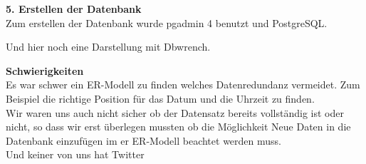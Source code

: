 \documentclass[a4paper ,8pt,x11names]{article}
\begin{document}
\newpage
\begin{flushleft}
\textbf{5. Erstellen der Datenbank}
\vspace{0.25cm}\\
Zum erstellen der Datenbank wurde pgadmin 4 benutzt und PostgreSQL.
\begin{center}
\end{center}
Und hier noch eine Darstellung mit Dbwrench.
\begin{center}
\end{center}
\end{flushleft}

\newpage
\begin{flushleft}
\textbf{Schwierigkeiten}
\vspace{0.25cm}\\
Es war schwer ein ER-Modell zu finden welches Datenredundanz vermeidet. Zum Beispiel die richtige Position für das Datum und die Uhrzeit zu finden.\\
Wir waren uns auch nicht sicher ob der Datensatz bereits vollständig ist oder nicht, so dass wir erst überlegen mussten ob die Möglichkeit Neue Daten in die Datenbank einzufügen im er ER-Modell beachtet werden muss.\\
Und keiner von uns hat Twitter\\
\end{flushleft}
\end{document}
